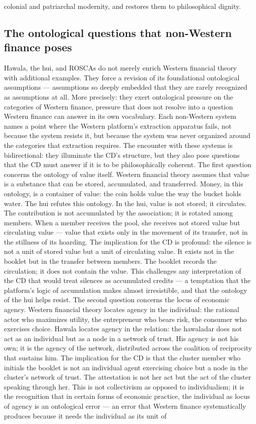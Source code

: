 colonial and patriarchal modernity, and restores them to philosophical dignity.

\subsection{The ontological questions that non-Western finance poses}

Hawala, the hui, and ROSCAs do not merely enrich Western financial theory with additional examples. They force a revision of its foundational ontological assumptions --- assumptions so deeply embedded that they are rarely recognized as assumptions at all. More precisely: they exert ontological pressure on the categories of Western finance, pressure that does not resolve into a question Western finance can answer in its own vocabulary. Each non-Western system names a point where the Western platform’s extraction apparatus fails, not because the system resists it, but because the system was never organized around the categories that extraction requires. The encounter with these systems is bidirectional: they illuminate the CD’s structure, but they also pose questions that the CD must answer if it is to be philosophically coherent. The first question concerns the ontology of value itself. Western financial theory assumes that value is a substance that can be stored, accumulated, and transferred. Money, in this ontology, is a container of value: the coin holds value the way the bucket holds water. The hui refutes this ontology. In the hui, value is not stored; it circulates. The contribution is not accumulated by the association; it is rotated among members. When a member receives the pool, she receives not stored value but circulating value — value that exists only in the movement of its transfer, not in the stillness of its hoarding. The implication for the CD is profound: the silence is not a unit of stored value but a unit of circulating value. It exists not in the booklet but in the transfer between members. The booklet records the circulation; it does not contain the value. This challenges any interpretation of the CD that would treat silences as accumulated credits — a temptation that the platform’s logic of accumulation makes almost irresistible, and that the ontology of the hui helps resist. The second question concerns the locus of economic agency. Western financial theory locates agency in the individual: the rational actor who maximizes utility, the entrepreneur who bears risk, the consumer who exercises choice. Hawala locates agency in the relation: the hawaladar does not act as an individual but as a node in a network of trust. His agency is not his own; it is the agency of the network, distributed across the coalition of reciprocity that sustains him. The implication for the CD is that the cluster member who initials the booklet is not an individual agent exercising choice but a node in the cluster’s network of trust. The attestation is not her act but the act of the cluster speaking through her. This is not collectivism as opposed to individualism; it is the recognition that in certain forms of economic practice, the individual as locus of agency is an ontological error — an error that Western finance systematically produces because it needs the individual as its unit of 